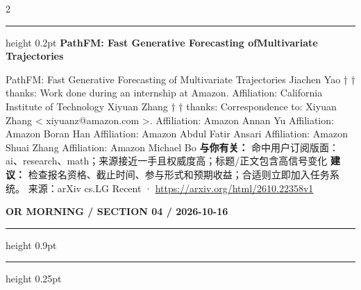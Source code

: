 \documentclass[10.5pt]{ctexart}
\begin{document}
\begin{multicols}{2}
\vspace{2mm}
\hrule height 0.2pt
\vspace{2mm}
{\large\bfseries PathFM: Fast Generative Forecasting ofMultivariate Trajectories}\par
PathFM: Fast Generative Forecasting of Multivariate Trajectories Jiachen Yao † † thanks: Work done during an internship at Amazon. Affiliation: California Institute of Technology Xiyuan Zhang † † thanks: Correspondence to: Xiyuan Zhang < xiyuanz@amazon.com >. Affiliation: Amazon Annan Yu Affiliation: Amazon Boran Han Affiliation: Amazon Abdul Fatir Ansari Affiliation: Amazon Shuai Zhang Affiliation: Amazon Michael Bo
\textbf{与你有关：} 命中用户订阅版面：ai、research、math；来源接近一手且权威度高；标题/正文包含高信号变化
\textbf{建议：} 检查报名资格、截止时间、参与形式和预期收益；合适则立即加入任务系统。
{\footnotesize\color{ormuted} 来源：arXiv cs.LG Recent · \url{https://arxiv.org/html/2610.22358v1}}
\end{multicols}
\newpage
{\small\bfseries OR MORNING / SECTION 04 / 2026-10-16}
\vspace{2mm}
\hrule height 0.9pt
\vspace{1.5mm}
\hrule height 0.25pt
\vspace{4mm}
\end{document}
